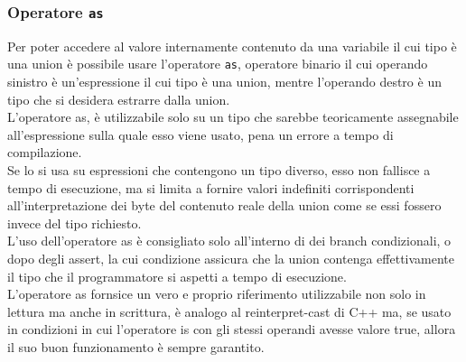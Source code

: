 \subsubsection{Operatore \texttt{as}}
Per poter accedere al valore internamente contenuto da una variabile il cui tipo è una union è possibile usare 
l’operatore \texttt{as}, operatore binario il cui operando sinistro è un'espressione il cui tipo è una union, mentre l’operando destro 
è un tipo che si desidera estrarre dalla union. \\

L’operatore as, è utilizzabile solo su un tipo che sarebbe teoricamente assegnabile all’espressione sulla quale esso viene usato, 
pena un errore a tempo di compilazione. \\

Se lo si usa su espressioni che contengono un tipo diverso, esso non fallisce a tempo di esecuzione, ma si limita a fornire valori 
indefiniti corrispondenti all’interpretazione dei byte del contenuto reale della union come se essi fossero invece del tipo richiesto. \\

L’uso dell’operatore as è consigliato solo all’interno di dei branch condizionali, o dopo degli assert, la cui condizione assicura che la union
contenga effettivamente il tipo che il programmatore si aspetti a tempo di esecuzione. \\   

L’operatore as fornsice un vero e proprio riferimento utilizzabile non solo in lettura ma anche in scrittura, 
è analogo al reinterpret-cast di C++ ma, se usato in condizioni in cui l’operatore is con gli stessi operandi 
avesse valore true, allora il suo buon funzionamento è sempre garantito.